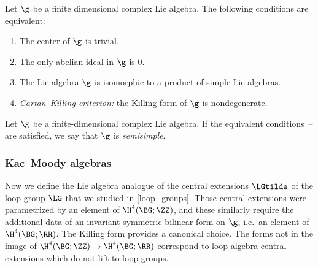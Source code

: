 \begin{proposition}\label{prop:semisimplicity}
	Let $ \g $ be a finite dimensional complex Lie algebra.
	The following conditions are equivalent:
	\begin{enumerate}	
		\item\label{prop:semisimplicity.0} The center of $ \g $ is trivial.

		\item\label{prop:semisimplicity.1} The only abelian ideal in $ \g $ is $ 0 $.

		\item\label{prop:semisimplicity.2} The Lie algebra $ \g $ is isomorphic to a product of simple Lie algebras.

		\item\label{prop:semisimplicity.3} \emph{Cartan--Killing criterion:} the Killing form of $ \g $ is
		nondegenerate.
	\end{enumerate}
\end{proposition}

\begin{definition}
	Let $ \g $ be a finite-dimensional complex Lie algebra.
	If the equivalent conditions~-- are satisfied,
	we say that $ \g $ is \textit{semisimple}.
\end{definition}


\subsubsection{Kac--Moody algebras}\label{subsec:KacMoody}

Now we define the Lie algebra analogue of the central extensions $ \LGtilde $ of the loop group $ \LG $ that we
studied in \cref{loop_groups}. Those central extensions were parametrized by an element of $\H^4(\BG;\ZZ)$, and
these similarly require the additional data of an invariant symmetric bilinear form on $ \g $, i.e.\ an element of
$\H^4(\BG;\RR)$. The Killing form provides a canonical choice. The forms not in the image of
$\H^4(\BG;\ZZ)\to\H^4(\BG; \RR)$ correspond to loop algebra central extensions which do not lift to loop groups.

